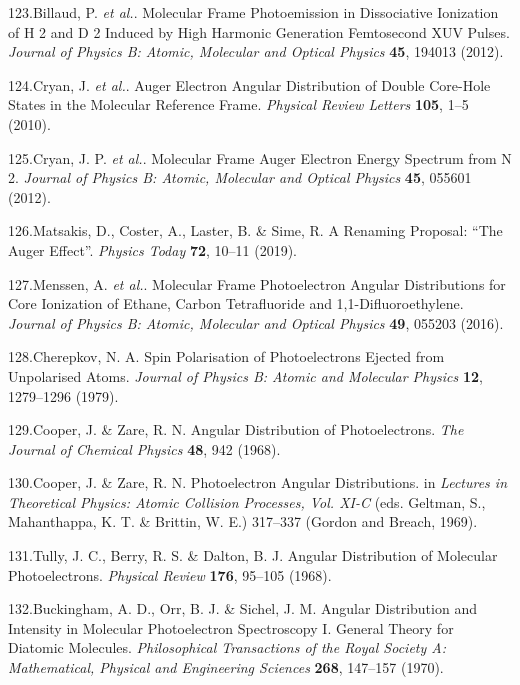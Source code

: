 \documentclass[10pt]{article}
\begin{document}
\label{csl:123}123.Billaud, P. \textit{et al.}. {Molecular Frame Photoemission in Dissociative Ionization of {{H}} 2 and {{D}} 2 Induced by High Harmonic Generation Femtosecond {{XUV}} Pulses}. \textit{Journal of Physics B: Atomic, Molecular and Optical Physics} \textbf{45}, 194013 (2012).

\label{csl:124}124.Cryan, J. \textit{et al.}. {Auger {{Electron Angular Distribution}} of {{Double Core-Hole States}} in the {{Molecular Reference Frame}}}. \textit{Physical Review Letters} \textbf{105}, 1–5 (2010).

\label{csl:125}125.Cryan, J. P. \textit{et al.}. {Molecular Frame {{Auger}} Electron Energy Spectrum from {{N}} 2}. \textit{Journal of Physics B: Atomic, Molecular and Optical Physics} \textbf{45}, 055601 (2012).

\label{csl:126}126.Matsakis, D., Coster, A., Laster, B. \& Sime, R. {A Renaming Proposal: ``{{The Auger}} Effect''}. \textit{Physics Today} \textbf{72}, 10–11 (2019).

\label{csl:127}127.Menssen, A. \textit{et al.}. {Molecular Frame Photoelectron Angular Distributions for Core Ionization of Ethane, Carbon Tetrafluoride and 1,1-Difluoroethylene}. \textit{Journal of Physics B: Atomic, Molecular and Optical Physics} \textbf{49}, 055203 (2016).

\label{csl:128}128.Cherepkov, N. A. {Spin Polarisation of Photoelectrons Ejected from Unpolarised Atoms}. \textit{Journal of Physics B: Atomic and Molecular Physics} \textbf{12}, 1279–1296 (1979).

\label{csl:129}129.Cooper, J. \& Zare, R. N. {Angular {{Distribution}} of {{Photoelectrons}}}. \textit{The Journal of Chemical Physics} \textbf{48}, 942 (1968).

\label{csl:130}130.Cooper, J. \& Zare, R. N. {Photoelectron {{Angular Distributions}}}. in \textit{Lectures in {{Theoretical Physics}}: {{Atomic Collision Processes}}, {{Vol}}. {{XI}}-{{C}}} (eds. Geltman, S., Mahanthappa, K. T. \& Brittin, W. E.) 317–337 ({Gordon and Breach}, 1969).

\label{csl:131}131.Tully, J. C., Berry, R. S. \& Dalton, B. J. {Angular {{Distribution}} of {{Molecular Photoelectrons}}}. \textit{Physical Review} \textbf{176}, 95–105 (1968).

\label{csl:132}132.Buckingham, A. D., Orr, B. J. \& Sichel, J. M. {Angular {{Distribution}} and {{Intensity}} in {{Molecular Photoelectron Spectroscopy I}}. {{General Theory}} for {{Diatomic Molecules}}}. \textit{Philosophical Transactions of the Royal Society A: Mathematical, Physical and Engineering Sciences} \textbf{268}, 147–157 (1970).
\end{document}
